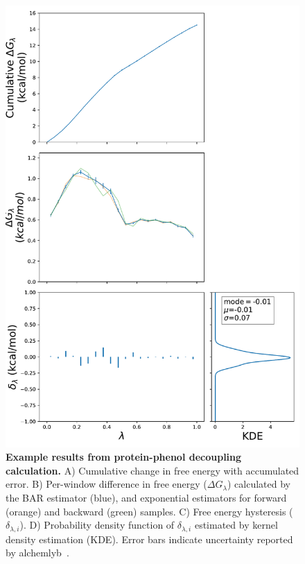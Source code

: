 \documentclass[9pt,tutorial]{Styling/livecoms}
\begin{document}
\begin{figure}[!h]
    \centering
    \includegraphics[width=1\linewidth]{bound_generalFigures}
    \caption{\textbf{Example results from protein-phenol decoupling calculation.} A) Cumulative change in free energy with accumulated error. B) Per-window difference in free energy ($\Delta G_\lambda$) calculated by the BAR estimator (blue), and exponential estimators for forward (orange) and backward (green) samples. C) Free energy hysteresis ($\delta_{\lambda,i}$). D) Probability density function of $\delta_{\lambda,i}$ estimated by kernel density estimation (KDE). Error bars indicate uncertainty reported by alchemlyb~\cite{shirts2008statistically}.
    }\label{fig:FEPexample}
\end{figure}
\end{document}
